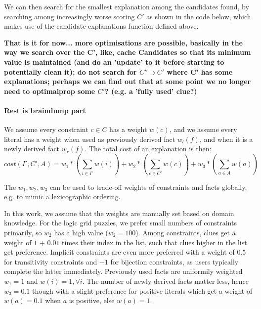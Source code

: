 We can then search for the smallest explanation among the candidates found, by searching among increasingly worse scoring $C'$ as shown in the code below, which makes use of the candidate-explanations function defined above.


\textbf{That is it for now... more optimisations are possible, basically in the way we search over the C', like, cache Candidates so that its minimum value is maintained (and do an 'update' to it before starting to potentially clean it); do not search for $C'' \supset C'$ where C' has some explanations; perhaps we can find out that at some point we no longer need to optimalprop some $C'$? (e.g. a 'fully used' clue?)}

\paragraph{Rest is braindump part}
We assume every constraint $c \in C$ has a weight $w(c)$, and we assume every literal has a weight when used as previously derived fact $w_l(f)$, and when it is a newly derived fact $w_r(f)$. The total cost of an explanation is then:
$$ cost(I', C', A) = w_1*(\sum_{i \in I'} w(i)) + w_2*(\sum_{c \in C'} w(c)) + w_3*(\sum_{a \in A} w(a))$$

The $w_1, w_2, w_3$ can be used to trade-off weights of constraints and facts globally, e.g. to mimic a lexicographic ordering.

In this work, we assume that the weights are manually set based on domain knowledge. For the logic grid puzzles, we prefer small numbers of constraints primarily, so $w_2$ has a high value ($w_2=100$). Among constraints, clues get a weight of $1$ + $0.01$ times their index in the list, such that clues higher in the list get preference. Implicit constraints are even more preferred with a weight of $0.5$ for transitivity constraints and $-1$ for bijection constraints, as users typically complete the latter immediately.
Previously used facts are uniformily weighted $w_1=1$ and $w(i)=1, \forall i$. The number of newly derived facts matter less, hence $w_3=0.1$ though with a slight preference for positive literals which get a weight of $w(a)=0.1$ when $a$ is positive, else $w(a)=1$.

